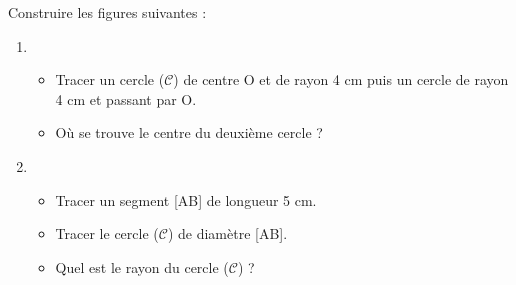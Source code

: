 \begin{exercice*}
   Construire les figures suivantes :
   \begin{enumerate}
      \item
      \begin{itemize}
         \item Tracer un cercle ($\mathcal{C}$) de centre O et de rayon 4 cm puis un cercle de rayon 4 cm et passant par O.
         \item Où se trouve le centre du deuxième cercle ?
      \end{itemize}
      \item
      \begin{itemize}
         \item Tracer un segment [AB] de longueur 5 cm.
         \item Tracer le cercle ($\mathcal{C}$) de diamètre [AB].
         \item Quel est le rayon du cercle ($\mathcal{C}$) ?
      \end{itemize}
   \end{enumerate}
 \end{exercice*} 

 